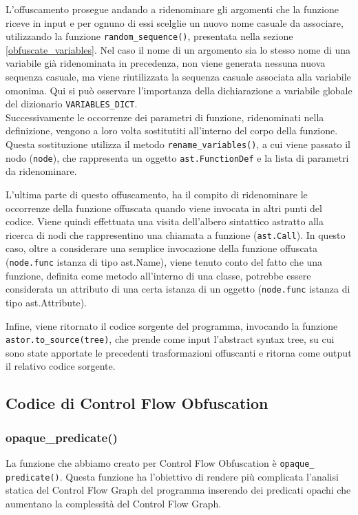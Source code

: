 \documentclass[a4paper,oneside,openright,titlepage,10pt,footinclude,headinclude]{scrbook}
\begin{document}
L'offuscamento prosegue andando a ridenominare gli argomenti che la funzione riceve in input e per ognuno di essi scelglie un nuovo nome casuale da associare, utilizzando la funzione \texttt{random\_sequence()}, presentata nella sezione \ref{obfuscate_variables}. Nel caso il nome di un argomento sia lo stesso nome di una variabile già ridenominata in precedenza, non viene generata nessuna nuova sequenza casuale, ma viene riutilizzata la sequenza casuale associata alla variabile omonima. Qui si può osservare l'importanza della dichiarazione a variabile globale del dizionario \texttt{VARIABLES\_DICT}.\\
Successivamente le occorrenze dei parametri di funzione, ridenominati nella definizione, vengono a loro volta sostitutiti all'interno del corpo della funzione. Questa sostituzione utilizza il metodo \texttt{rename\_variables()}, a cui viene passato il nodo (\texttt{node}), che rappresenta un oggetto \texttt{ast.FunctionDef} e la lista di parametri da ridenominare.\medskip

L'ultima parte di questo offuscamento, ha il compito di ridenominare le occorrenze della funzione offuscata quando viene invocata in altri punti del codice. Viene quindi effettuata una visita dell'albero sintattico astratto alla ricerca di nodi che rappresentino una chiamata a funzione (\texttt{ast.Call}).
In questo caso, oltre a considerare una semplice invocazione della funzione  offuscata (\texttt{node.func} istanza di tipo ast.Name), viene tenuto conto del fatto che una funzione, definita come metodo all'interno di una classe, potrebbe essere considerata un attributo di una certa istanza di un oggetto (\texttt{node.func} istanza di tipo ast.Attribute).\medskip

Infine, viene ritornato il codice sorgente del programma, invocando la funzione  \texttt{astor.to\_source(tree)}, che prende come input l'abstract syntax tree, su cui sono state apportate le precedenti trasformazioni offuscanti e ritorna come output il relativo codice sorgente.


\subsection{Codice di Control Flow Obfuscation}

\subsubsection{opaque\_predicate()}
La funzione che abbiamo creato per Control Flow Obfuscation è \texttt{opaque\_\\predicate()}. Questa funzione ha l'obiettivo di rendere più complicata l'analisi statica del Control Flow Graph del programma inserendo dei predicati opachi che aumentano la complessità del Control Flow Graph.
\end{document}
